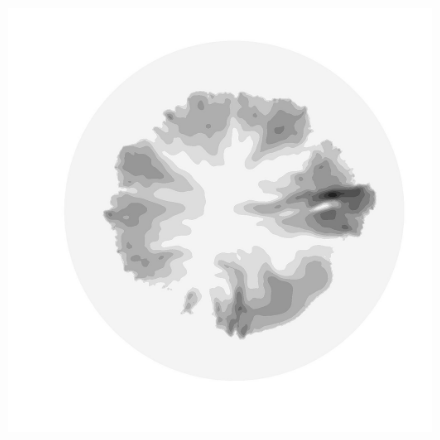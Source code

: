 \begin{figure}
\begin{minipage}[b]{0.30\linewidth}
  \end{minipage}
  \quad
  \begin{minipage}[b]{0.30\linewidth}
    \includegraphics[width=1.0\textwidth]{images/EISMINT_II/U/U_mag_10000.jpg}
  \end{minipage}
  

\end{figure}
